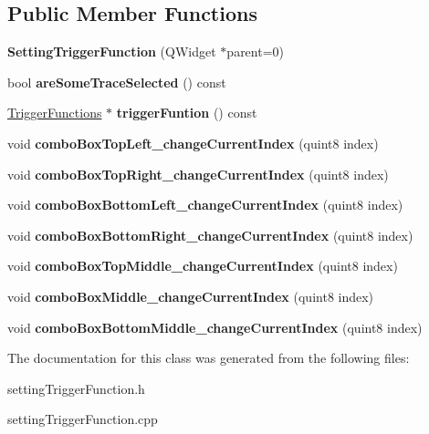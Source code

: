 \subsection*{Public Member Functions}
\begin{DoxyCompactItemize}
\item 
\mbox{\label{class_setting_trigger_function_a2733485253e83e34df25bbbf691b9b87}} 
{\bfseries Setting\+Trigger\+Function} (Q\+Widget $\ast$parent=0)
\item 
\mbox{\label{class_setting_trigger_function_a57fcf9c05feea62c47ac2a040c82dea8}} 
bool {\bfseries are\+Some\+Trace\+Selected} () const
\item 
\mbox{\label{class_setting_trigger_function_aa62a652e3abb499624718d3b30f80505}} 
\hyperlink{class_trigger_functions}{Trigger\+Functions} $\ast$ {\bfseries trigger\+Funtion} () const
\item 
\mbox{\label{class_setting_trigger_function_a48056525880c23709629d8ecae720195}} 
void {\bfseries combo\+Box\+Top\+Left\+\_\+change\+Current\+Index} (quint8 index)
\item 
\mbox{\label{class_setting_trigger_function_a42421130b3fe602d31e9987d1485ba03}} 
void {\bfseries combo\+Box\+Top\+Right\+\_\+change\+Current\+Index} (quint8 index)
\item 
\mbox{\label{class_setting_trigger_function_ab634b106adb8ec4b27b253f55015ed57}} 
void {\bfseries combo\+Box\+Bottom\+Left\+\_\+change\+Current\+Index} (quint8 index)
\item 
\mbox{\label{class_setting_trigger_function_aa425324bba6b7991b3b6b626b8a5606b}} 
void {\bfseries combo\+Box\+Bottom\+Right\+\_\+change\+Current\+Index} (quint8 index)
\item 
\mbox{\label{class_setting_trigger_function_a5935ffb8b13d59514f2c43c92cf09513}} 
void {\bfseries combo\+Box\+Top\+Middle\+\_\+change\+Current\+Index} (quint8 index)
\item 
\mbox{\label{class_setting_trigger_function_ad5c9bf25f21350c4bba70f5786a57d68}} 
void {\bfseries combo\+Box\+Middle\+\_\+change\+Current\+Index} (quint8 index)
\item 
\mbox{\label{class_setting_trigger_function_ae2ae37fb51f610396291dd32227a0932}} 
void {\bfseries combo\+Box\+Bottom\+Middle\+\_\+change\+Current\+Index} (quint8 index)
\end{DoxyCompactItemize}


The documentation for this class was generated from the following files\+:\begin{DoxyCompactItemize}
\item 
setting\+Trigger\+Function.\+h\item 
setting\+Trigger\+Function.\+cpp\end{DoxyCompactItemize}
